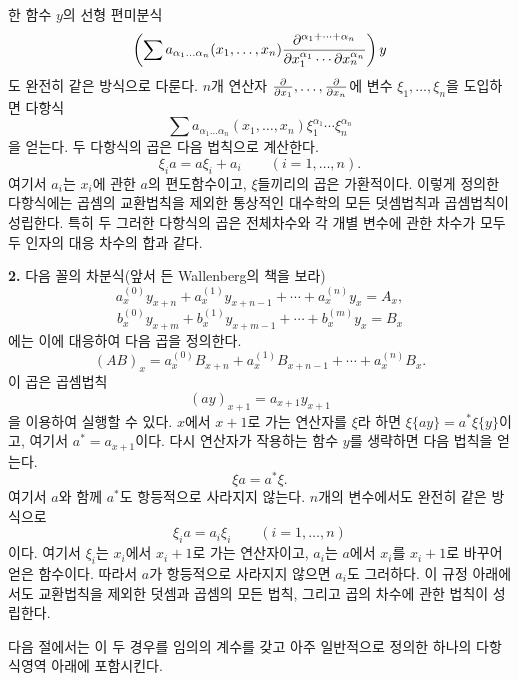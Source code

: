 한 함수 \(y\)의 선형 편미분식
\[
 \left(\sum a_{\alpha_1\ldots\alpha_n}(x_1,\ldots,x_n)
 \frac{\partial^{\alpha_1+\cdots+\alpha_n}}
 {\partial x_1^{\alpha_1}\cdots\partial x_n^{\alpha_n}}\right)y
\]
도 완전히 같은 방식으로 다룬다. \(n\)개 연산자 \(\frac{\partial}{\partial x_1},\ldots,\frac{\partial}{\partial x_n}\)에 변수 \(\xi_1,\ldots,\xi_n\)을 도입하면 다항식
\[
 \sum a_{\alpha_1\ldots\alpha_n}(x_1,\ldots,x_n)
 \xi_1^{\alpha_1}\cdots\xi_n^{\alpha_n}
\]
을 얻는다. 두 다항식의 곱은 다음 법칙으로 계산한다.
\begin{equation}
 \xi_i a=a\xi_i+a_i \qquad (i=1,\ldots,n).
\tag{2}
\end{equation}
여기서 \(a_i\)는 \(x_i\)에 관한 \(a\)의 편도함수이고, \(\xi\)들끼리의 곱은 가환적이다. 이렇게 정의한 다항식에는 곱셈의 교환법칙을 제외한 통상적인 대수학의 모든 덧셈법칙과 곱셈법칙이 성립한다. 특히 두 그러한 다항식의 곱은 전체차수와 각 개별 변수에 관한 차수가 모두 두 인자의 대응 차수의 합과 같다.

\textbf{2.} 다음 꼴의 차분식(앞서 든 Wallenberg의 책을 보라)
\[
 a_x^{(0)}y_{x+n}+a_x^{(1)}y_{x+n-1}+\cdots+a_x^{(n)}y_x=A_x,
\]
\[
 b_x^{(0)}y_{x+m}+b_x^{(1)}y_{x+m-1}+\cdots+b_x^{(m)}y_x=B_x
\]
에는 이에 대응하여 다음 곱을 정의한다.
\[
 (AB)_x=a_x^{(0)}B_{x+n}+a_x^{(1)}B_{x+n-1}+\cdots+a_x^{(n)}B_x.
\]
이 곱은 곱셈법칙
\[
 (ay)_{x+1}=a_{x+1}y_{x+1}
\]
을 이용하여 실행할 수 있다. \(x\)에서 \(x+1\)로 가는 연산자를 \(\xi\)라 하면 \(\xi\{ay\}=a^*\xi\{y\}\)이고, 여기서 \(a^*=a_{x+1}\)이다. 다시 연산자가 작용하는 함수 \(y\)를 생략하면 다음 법칙을 얻는다.
\begin{equation}
 \xi a=a^*\xi.
\tag{3}
\end{equation}
여기서 \(a\)와 함께 \(a^*\)도 항등적으로 사라지지 않는다. \(n\)개의 변수에서도 완전히 같은 방식으로
\begin{equation}
 \xi_i a=a_i\xi_i\qquad (i=1,\ldots,n)
\tag{4}
\end{equation}
이다. 여기서 \(\xi_i\)는 \(x_i\)에서 \(x_i+1\)로 가는 연산자이고, \(a_i\)는 \(a\)에서 \(x_i\)를 \(x_i+1\)로 바꾸어 얻은 함수이다. 따라서 \(a\)가 항등적으로 사라지지 않으면 \(a_i\)도 그러하다. 이 규정 아래에서도 교환법칙을 제외한 덧셈과 곱셈의 모든 법칙, 그리고 곱의 차수에 관한 법칙이 성립한다.

다음 절에서는 이 두 경우를 임의의 계수를 갖고 아주 일반적으로 정의한 하나의 다항식영역 아래에 포함시킨다.


